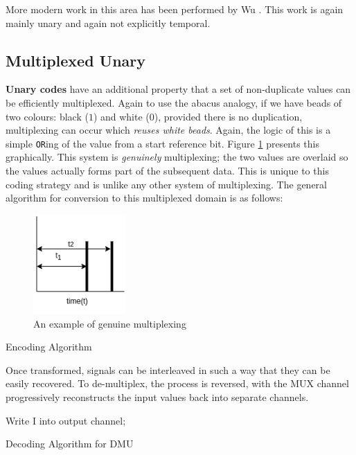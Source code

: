 \documentclass{article}
\begin{document}
More modern work in this area has been performed by Wu \cite{wu2020ugemm} \cite{pan2022t} \cite{wu2022usystolic}. This work is again mainly unary and again not explicitly temporal. 

\subsection{Multiplexed Unary}

\textbf{Unary codes} have an additional property that a set of non-duplicate values can be efficiently multiplexed. Again to use the abacus analogy, if we have beads of two colours: black ($1$) and white ($0$), provided there is no duplication, multiplexing can occur which \textit{reuses white beads}. Again, the logic of this is a simple \texttt{OR}ing of the value from a start reference bit. Figure \ref{fig:mul1} presents this graphically. This system is \emph{genuinely} multiplexing; the two values are overlaid so the values actually forms part of the subsequent data. This is unique to this coding strategy and is unlike any other system of multiplexing. The general algorithm for conversion to this multiplexed domain is as follows:


\begin{figure}
  \centerline{\includegraphics[width=100pt]{figures/multiplex.png}}
  \caption{An example of genuine multiplexing}\label{fig:mul1}
\end{figure}

\begin{algorithm}
  \SetAlgoLined %
\caption{Encoding Algorithm}
\end{algorithm}

Once transformed, signals can be interleaved in such a way that they can be easily recovered. To de-multiplex, the process is reversed, with the MUX channel progressively reconstructs the input values back into separate channels.

\begin{algorithm}
  \SetAlgoLined %
   {
     {
        Write I into output channel;
      }
  }
\caption{Decoding Algorithm for DMU} 
\end{algorithm}
\end{document}

